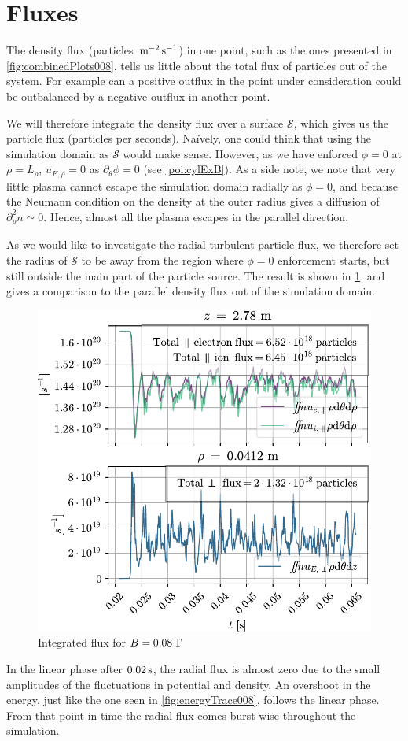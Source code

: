 \section{Fluxes}
\label{sec:fluxes}
%
The density flux (particles $\, \text{m}^{-2}\, \text{s}^{-1}$) in one point, such as the ones presented in \cref{fig:combinedPlots008}, tells us little about the total flux of particles out of the system.
For example can a positive outflux in the point under consideration could be outbalanced by a negative outflux in another point.

We will therefore integrate the density flux over a surface $\mathcal{S}$, which gives us the particle flux (particles per seconds).
Na{\"i}vely, one could think that using the simulation domain as $\mathcal{S}$ would make sense.
However, as we have enforced $\phi=0$ at $\rho=L_\rho$, $u_{E,\rho}=0$ as $\partial_\theta \phi=0$ (see \cref{poi:cylExB}).
As a side note, we note that very little plasma cannot escape the simulation domain radially as $\phi=0$, and because the Neumann condition on the density at the outer radius gives a diffusion of $\partial_\rho^2 n \simeq 0$.
Hence, almost all the plasma escapes in the parallel direction.

As we would like to investigate the radial turbulent particle flux, we therefore set the radius of $\mathcal{S}$ to be away from the region where $\phi=0$ enforcement starts, but still outside the main part of the particle source.
The result is shown in \cref{fig:flux008}, and gives a comparison to the parallel density flux out of the simulation domain.
%
\begin{figure}[htb]
    \centering
    \includegraphics{fig/results/totalFlux/flux008}
    \caption{Integrated flux for $B=0.08\, \text{T}$}
    \label{fig:flux008}
\end{figure}
%
In the linear phase after $0.02\, \text{s}$, the radial flux is almost zero due to the small amplitudes of the fluctuations in potential and density.
An overshoot in the energy, just like the one seen in \cref{fig:energyTrace008}, follows the linear phase.
From that point in time the radial flux comes burst-wise throughout the simulation.

